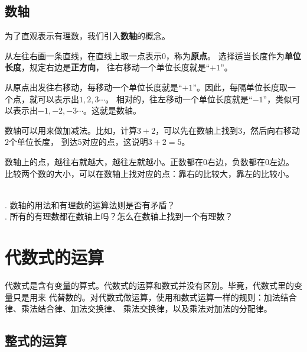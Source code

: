 \documentclass[12pt,UTF8,fontset=none]{ctexbook}
\begin{document}
\section{数轴}
为了直观表示有理数，我们引入\textbf{数轴}的概念。

从左往右画一条直线，在直线上取一点表示$0$，称为\textbf{原点}。
选择适当长度作为\textbf{单位长度}，规定右边是\textbf{正方向}，
往右移动一个单位长度就是“$+1$”。

从原点出发往右移动，每移动一个单位长度就是“$+1$”。因此，每隔单位长度取一个点，就可以表示出$1,2,3\cdots$。
相对的，往左移动一个单位长度就是“$-1$”，类似可以表示出$-1,-2,-3\cdots$。这就是数轴。

数轴可以用来做加减法。比如，计算$3+2$，可以先在数轴上找到$3$，然后向右移动$2$个单位长度，
到达$5$对应的点，这说明$3+2=5$。

数轴上的点，越往右就越大，越往左就越小。正数都在$0$右边，负数都在$0$左边。
比较两个数的大小，可以在数轴上找对应的点：靠右的比较大，靠左的比较小。

\begin{sk}\label{sk:3-2-0}
    \mbox{} \\
    . 数轴的用法和有理数的运算法则是否有矛盾？\\
    . 所有的有理数都在数轴上吗？怎么在数轴上找到一个有理数？
\end{sk}

\chapter{代数式的运算}
代数式是含有变量的算式。代数式的运算和数式并没有区别。毕竟，代数式里的变量只是用来
代替数的。对代数式做运算，使用和数式运算一样的规则：加法结合律、乘法结合律、加法交换律、
乘法交换律，以及乘法对加法的分配律。

\section{整式的运算}
\end{document}
